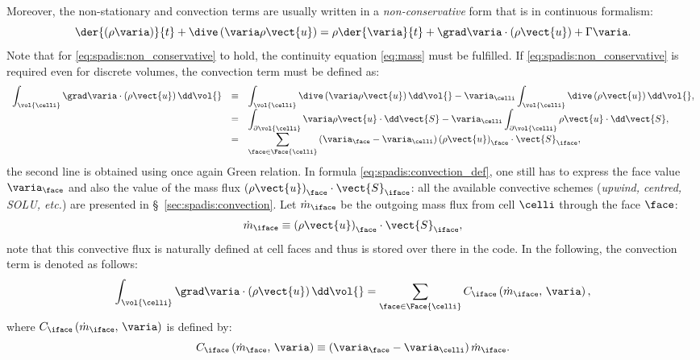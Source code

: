 Moreover, the non-stationary and convection terms are usually written in a \emph{non-conservative} form that is in continuous formalism:
\begin{equation}\label{eq:spadis:non_conservative}
 \der{ \left( \rho\varia \right)}{t} + \dive \left(  \varia  \rho \vect{u}\right) = \rho \der{\varia }{t} + \grad \varia \cdot \left( \rho \vect{u}\right) + \Gamma \varia.
 \end{equation}
 Note that for \eqref{eq:spadis:non_conservative} to hold, the continuity equation \eqref{eq:mass} must be fulfilled. 
 If \eqref{eq:spadis:non_conservative} is required even for discrete volumes, the convection term must be defined as:
 \begin{equation}\label{eq:spadis:convection_def}
 \begin{array}{r c l}
\displaystyle \int_{\vol{\celli}} \grad \varia \cdot \left( \rho \vect{u} \right) \dd \vol{} &\equiv &
\displaystyle \int_{\vol{\celli}}  \dive \left( \varia \rho \vect{u} \right) \dd \vol{}  - \varia_\celli  \int_{\vol{\celli}} \dive \left(\rho \vect{u} \right) \dd \vol{}, \\
 &=& 
 \displaystyle \int_{ \partial \vol{\celli}}   \varia \rho \vect{u} \cdot \dd \vect{S}  - \varia_\celli  \int_{ \partial \vol{\celli}} \rho \vect{u} \cdot \dd \vect{S}, \\
 &=& 
\displaystyle \sum_{\face \in \Face{\celli}} \left(\varia_\face - \varia_\celli \right) \left(\rho \vect{u}\right)_\face \cdot \vect{S}_{\iface},
 \end{array}
 \end{equation}
the second line is obtained using once again Green relation. In formula \eqref{eq:spadis:convection_def}, one still has to express the face value
 $\varia_\face$ and also the value of the mass flux $\left(\rho \vect{u}\right)_\face\cdot \vect{S}_{\iface}$: all the available convective schemes (\emph{upwind, centred, SOLU, etc.}) are presented in \S~\ref{sec:spadis:convection}. Let $\dot{m}_\iface$ be the outgoing
 mass flux from cell $\celli$ through the face $\face$:
  \begin{equation}\label{eq:spadis:massflux_def}
\dot{m}_\iface \equiv \left(\rho \vect{u}\right)_\face \cdot \vect{S}_{\iface},
 \end{equation}
note that this convective flux is naturally defined at cell faces and thus is stored over there in the code. In the following, the convection term is denoted as follows:
\begin{equation}\label{eq:spadis:convection_notation}
\displaystyle \int_{\vol{\celli}} \grad \varia \cdot \left( \rho \vect{u} \right) \dd \vol{} 
=
\displaystyle \sum_{\face \in \Face{\celli}} C_\iface \left( \dot{m}_\iface , \, \varia \right),
 \end{equation}
where $C_\iface \left(  \dot{m}_\iface  , \, \varia\right)$ is defined by:
\begin{equation}\label{eq:spadis:convection_flux}
C_\iface \left(\dot{m}_\face , \, \varia \right) \equiv  \left(\varia_\face - \varia_\celli \right) \dot{m}_\iface.
 \end{equation}

